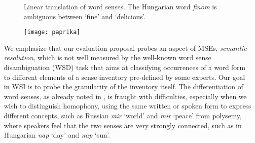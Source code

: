 \documentclass[11pt]{article}
\begin{document}
\begin{figure}
    \centering
    \resizebox{\columnwidth}{!} {
    }
    \caption{Linear translation of word senses. The Hungarian word
        \emph{finom} is ambiguous between `fine' and `delicious'.}
        \label{fig:AdaGram}
\end{figure}

\begin{figure}
\texttt{[image: paprika]}
\end{figure}

We emphasize that our evaluation proposal probes an aspect of MSEs,
\emph{semantic resolution}, which is not well measured by the well-known word
sense disambiguation (WSD) task that aims at classifying occurrences of a word
form to different elements of a sense inventory pre-defined by some experts.
Our goal in WSI is to probe the granularity of the inventory itself.  The
differentiation of word senses, as already noted in \cite{Borbely:2016}, is
fraught with difficulties, especially when we wish to distinguish homophony,
using the same written or spoken form to express different concepts, such as
Russian {\it mir} `world' and {\it mir} `peace' from polysemy, where speakers
feel that the two senses are very strongly connected, such as in Hungarian {\it
nap} `day' and {\it nap} `sun'.  

\end{document}
